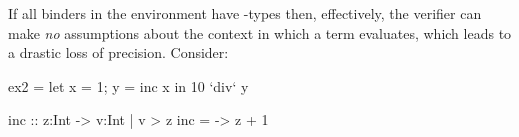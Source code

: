 \begin{comment}
We address this problem by observing that a pattern match forces evaluation. 
Hence, inside each case of the @case-of@ expression, the scrutinee and match 
binder are guaranteed to be Haskell values in WHNF.  
%
This intuition is formalized by the typing rule (\rtcased), which checks each 
case after assuming the scrutinee and the match binder have \Wnf types. 
%
With this optimization, the call to @error@ yields the subtyping query:
%
\begin{align*}
	\begin{array}{l}
   \tbind{\ttxs}{\tref{\ttxs}{[\tta]}{\trivial}{\lnot (\ttemp\ \ttxs)}} \\
   \tbind{\ttb}{\tref{\ttb}{[\tta]}{\trivial}{(\ttemp\ \ttxs)}}  	
	\end{array} & \vdash \subtref{\tttrue}{\ttfalse} \\
\intertext{That is, both $\ttxs$ and $\ttb$ have \Wnf types.
  Now, the verifier \emph{accepts} the program as the above subtyping reduces to the valid VC}
  \lnot (\ttemp\ \ttxs) \wedge (\ttemp\ \ttxs) \Rightarrow\ & \tttrue \Rightarrow\ \ttfalse
\end{align*}
%
The above method also applies to terms that have been @seq@-ed or have strictness 
annotations.
%
Consequently, our system can naturally support idiomatic 
Haskell, \eg taking the @head@ of an infinite list:
%
\begin{code}
  ex2 x    = head (repeat x)
  
  repeat   :: a -> {v:[a] | not (emp v)}
  repeat y = y : repeat y
\end{code}
%

\end{comment} 
\label{sec:pattern-match}
If all binders in the environment have \Div-types then, effectively, 
the verifier can make \emph{no} assumptions about the context in 
which a term evaluates, which leads to a drastic loss of precision. 
Consider:
\begin{code}
  ex2 = let {x = 1; y = inc x} in 10 `div` y

  inc :: z:Int -> {v:Int | v > z }
  inc = \z -> z + 1
\end{code}

